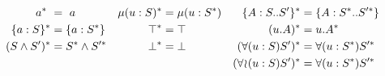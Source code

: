 \begin{align*}
    a^{*} \                     &= \ a
        & \mu(u : S)^{*}        &= \mu(u : S^{*})
        & \{A : S .. S'\}^{*}   &= \{A : S^{*} .. S'^{*}\} \\
    \{a : S\}^{*}             &= \{a : S^{*}\}
        & \top^{*}              &= \top
        & (u.A)^{*}             &= u.A^{*}                     \\
    (S \wedge S')^{*}           &= S^{*} \wedge S'^{*}
        & \bot^{*}              &= \bot
        & (\forall(u:S)S')^{*} &= \forall(u:S^{*})S'^{*} \\
    & & & & (\forall\!\wr\!(u:S)S')^{*} &= \forall(u:S^{*})S'^{*} \\
\end{align*}
